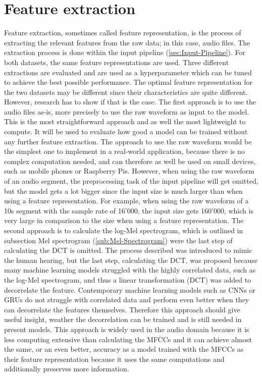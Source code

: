 \section{Feature extraction}
\label{sec:Feature-Extraction}
Feature extraction, sometimes called feature representation, is the process of extracting the relevant features from the raw data; in this case, audio files. The extraction process is done within the input pipeline (\ref{sec:Input-Pipeline}). For both datasets, the same feature representations are used. Three different extractions are evaluated and are used as a hyperparameter which can be tuned to achieve the best possible performance. The optimal feature representation for the two datasets may be different since their characteristics are quite different. However, research has to show if that is the case.
\newline
\newline
The first approach is to use the audio files as-is, more precisely to use the raw waveform as input to the model. This is the most straightforward approach and as well the most lightweight to compute. It will be used to evaluate how good a model can be trained without any further feature extraction. The approach to use the raw waveform would be the simplest one to implement in a real-world application, because there is no complex computation needed, and can therefore as well be used on small devices, such as mobile phones or Raspberry Pis. However, when using the raw waveform of an audio segment, the preprocessing task of the input pipeline will get omitted, but the model gets a lot bigger since the input size is much larger than when using a feature representation. For example, when using the raw waveform of a 10s segment with the sample rate of 16'000, the input size gets 160'000, which is very large in comparison to the size when using a feature representation.
\newline
\newline
The second approach is to calculate the log-Mel spectrogram, which is outlined in subsection Mel spectrogram (\ref{sub:Mel-Spectrogram}) were the last step of calculating the \gls{DCT} is omitted. The process described was introduced to mimic the human hearing, but the last step, calculating the \gls{DCT}, was proposed because many machine learning models struggled with the highly correlated data, such as the log-Mel spectrogram, and thus a linear transformation (\gls{DCT}) was added to decorrelate the feature. Contemporary machine learning models such as \glspl{CNN} or \glspl{GRU} do not struggle with correlated data and perform even better when they can decorrelate the features themselves. Therefore this approach should give useful insight, weather the decorrelation can be trained and is still needed in present models. This approach is widely used in the audio domain because it is less computing extensive than calculating the \glspl{MFCC} and it can achieve almost the same, or an even better, accuracy as a model trained with the \glspl{MFCC} as their feature representation because it uses the same computations and additionally preserves more information.
